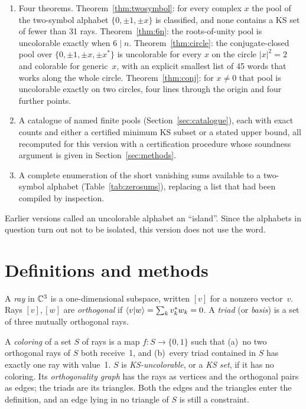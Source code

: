 \begin{enumerate}[label=(\roman*)]
\item Four theorems.  Theorem~\ref{thm:twosymbol}: for every complex $x$ the pool of the
two-symbol alphabet $\{0,\pm1,\pm x\}$ is classified, and none contains a KS set of fewer than
31 rays.  Theorem~\ref{thm:6n}: the roots-of-unity pool is uncolorable exactly when
$6\mid n$.  Theorem~\ref{thm:circle}: the conjugate-closed pool over $\{0,\pm1,\pm x,\pm x^{*}\}$
is uncolorable for every $x$ on the circle $|x|^2=2$ and colorable for generic~$x$, with an
explicit smallest list of 45 words that works along the whole circle.
Theorem~\ref{thm:conj}: for $x\ne0$ that pool is uncolorable exactly on two circles, four lines
through the origin and four further points.
\item A catalogue of named finite pools (Section~\ref{sec:catalogue}), each with exact counts and
either a certified minimum KS subset or a stated upper bound, all recomputed for this version
with a certification procedure whose soundness argument is given in Section~\ref{sec:methods}.
\item A complete enumeration of the short vanishing sums available to a two-symbol alphabet
(Table~\ref{tab:zerosums}), replacing a list that had been compiled by inspection.
\end{enumerate}

Earlier versions called an uncolorable alphabet an ``island''.  Since the alphabets in question
turn out not to be isolated, this version does not use the word.

\section{Definitions and methods}\label{sec:prelim}

\begin{definition}
A \emph{ray} in $\mathbb{C}^3$ is a one-dimensional subspace, written $[v]$ for a nonzero vector~$v$.
Rays $[v],[w]$ are \emph{orthogonal} if $\langle v|w\rangle=\sum_k v_k^{*}w_k=0$.  A \emph{triad} (or
\emph{basis}) is a set of three mutually orthogonal rays.
\end{definition}

\begin{definition}
A \emph{coloring} of a set $S$ of rays is a map $f:S\to\{0,1\}$ such that (a)~no two orthogonal
rays of $S$ both receive~1, and (b)~every triad contained in $S$ has exactly one ray with value~1.
$S$ is \emph{KS-uncolorable}, or a \emph{KS set}, if it has no coloring.  Its \emph{orthogonality
graph} has the rays as vertices and the orthogonal pairs as edges; the triads are its triangles.
Both the edges and the triangles enter the definition, and an edge lying in no triangle of $S$
is still a constraint.
\end{definition}

